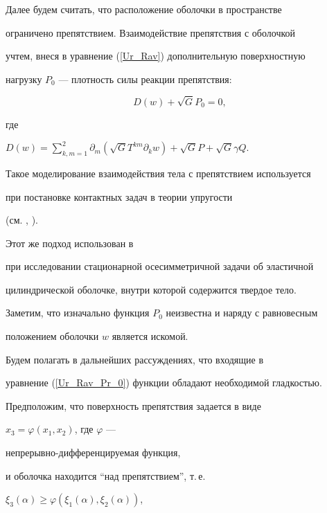 Далее будем считать, что расположение оболочки в пространстве 


ограничено препятствием. Взаимодействие препятствия с оболочкой


учтем, внеся в уравнение (\ref{Ur_Rav}) дополнительную поверхностную


нагрузку $P_0$ --- плотность силы реакции препятствия:


\begin{equation}


D(w)+\sqrt G P_0=0, 


\label{Ur_Rav_Pr_0}


\end{equation}


где 


$D(w)=\sum\limits_{k,m=1}^{2} \partial_m (\sqrt G T^{km} \partial_k w )+


\sqrt G P+\sqrt G \gamma Q$.


Такое моделирование взаимодействия тела с препятствием используется


при постановке контактных задач в теории упругости


(см. \cite{Duv}, \cite{Pan}).


Этот же подход использован в \cite{Kid} 


при исследовании стационарной осесимметричной задачи об эластичной 


цилиндрической оболочке, внутри которой содержится твердое тело.


Заметим, что изначально функция $P_0$ неизвестна и наряду с равновесным


положением оболочки $w$ является искомой.





Будем полагать в дальнейших рассуждениях, что входящие в 


уравнение (\ref{Ur_Rav_Pr_0}) функции обладают необходимой гладкостью.





Предположим, что поверхность препятствия задается в виде


$x_3=\varphi (x_1,x_2)$, где $\varphi$ ---


непрерывно-дифференцируемая функция,


и оболочка находится ``над препятствием'', т.\,е. \linebreak


$\xi_3(\alpha ) \geq \varphi (\xi_1(\alpha ),\xi_2(\alpha ))$,


